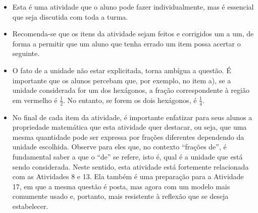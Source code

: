 \begin{multicols}{2}
\begin{itemize} %
    \item       Esta é uma atividade que o aluno pode fazer individualmente, mas é essencial que seja discutida com toda a turma.
    \item       Recomenda-se que os itens da atividade sejam feitos e corrigidos um a um, de forma a permitir que um aluno que tenha errado um item possa acertar o seguinte.
    \item       O fato de a unidade não estar explicitada, torna ambígua a questão. É importante que os alunos percebam que, por exemplo, no item a), se a unidade considerada for um dos hexágonos, a fração correspondente à região em vermelho é $\frac{1}{2}$. No entanto, se forem os dois hexágonos, é $\frac{1}{4}$.
    \item       No final de cada item da atividade, é importante enfatizar para seus alunos a propriedade matemática que esta atividade quer destacar, ou seja, que uma mesma quantidade pode ser expressa por frações diferentes dependendo da unidade escolhida. Observe para eles que, no contexto       ``frações de'', é fundamental saber a que o       ``de''     se refere, isto é, qual é a unidade que está sendo considerada. Neste sentido, esta atividade está fortemente relacionada com as Atividades 8 e 13. Ela também é uma preparação para a Atividade 17, em que a mesma questão é posta, mas agora com um modelo mais comumente usado e, portanto, mais resistente à reflexão que se deseja estabelecer.
\end{itemize} %


  \vspace{.1cm}


\def \tripinha{ (30:4) -- (90:4) -- (150:4)--(210:4)--(270:4)--(330:4) [shift={({4*sqrt(3)},0)}] --(270:4) -- (330:4) -- (30:4) -- (90:4)--(150:4)--cycle;}


\def \tripa{ (30:4) -- (90:4) -- (150:4)--(210:4)--(270:4)--(330:4) [shift={({4*sqrt(3)},0)}] --(270:4) -- (330:4) [shift={({4*sqrt(3)},0)}]--  (270:4) -- (330:4) -- (30:4) -- (90:4)--(150:4) [shift={({-4*sqrt(3)},0)}] -- (90:4) -- (150:4)--cycle;}


\end{multicols}
